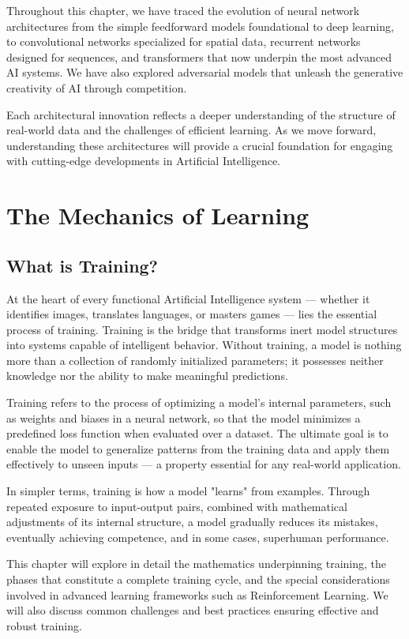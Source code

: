 \documentclass[openany]{book}
\begin{document}
Throughout this chapter, we have traced the evolution of neural network 
architectures from the simple feedforward models foundational to deep learning, 
to convolutional networks specialized for spatial data, recurrent networks 
designed for sequences, and transformers that now underpin the most advanced AI 
systems. We have also explored adversarial models that unleash the generative 
creativity of AI through competition.

Each architectural innovation reflects a deeper understanding of the structure 
of real-world data and the challenges of efficient learning. As we move forward, 
understanding these architectures will provide a crucial foundation for engaging 
with cutting-edge developments in Artificial Intelligence.

\chapter{The Mechanics of Learning}

\section{What is Training?}

At the heart of every functional Artificial Intelligence system — whether it 
identifies images, translates languages, or masters games — lies the essential 
process of training. Training is the bridge that transforms inert model 
structures into systems capable of intelligent behavior. Without training, a 
model is nothing more than a collection of randomly initialized parameters; it 
possesses neither knowledge nor the ability to make meaningful predictions.

Training refers to the process of optimizing a model's internal parameters, such
as weights and biases in a neural network, so that the model minimizes a 
predefined loss function when evaluated over a dataset. The ultimate goal is to 
enable the model to generalize patterns from the training data and apply them 
effectively to unseen inputs — a property essential for any real-world 
application.

In simpler terms, training is how a model "learns" from examples. Through 
repeated exposure to input-output pairs, combined with mathematical adjustments 
of its internal structure, a model gradually reduces its mistakes, eventually 
achieving competence, and in some cases, superhuman performance.

This chapter will explore in detail the mathematics underpinning training, the 
phases that constitute a complete training cycle, and the special considerations 
involved in advanced learning frameworks such as Reinforcement Learning. We will
also discuss common challenges and best practices ensuring effective and robust 
training.
\end{document}
